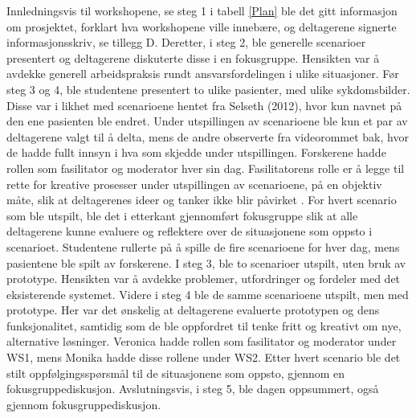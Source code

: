 \noindent
Innledningsvis til workshopene, se steg 1 i tabell \ref{Plan} ble det gitt informasjon om prosjektet, forklart hva workshopene ville innebære, og deltagerene signerte informasjonsskriv, se tillegg D. Deretter, i steg 2, ble generelle scenarioer presentert og deltagerene diskuterte disse i en fokusgruppe. Hensikten var å avdekke generell arbeidspraksis rundt ansvarsfordelingen i ulike situasjoner.
Før steg 3 og 4, ble studentene presentert to ulike pasienter, med ulike sykdomsbilder. Disse var i likhet med scenarioene hentet fra Selseth (2012), hvor kun navnet på den ene pasienten ble endret. Under utspillingen av scenarioene ble kun et par av deltagerene valgt til å delta, mens de andre observerte fra videorommet bak, hvor de hadde fullt innsyn i hva som skjedde under utspillingen. Forskerene hadde rollen som fasilitator og moderator hver sin dag. Fasilitatorens rolle er å legge til rette for kreative prosesser under utspillingen av scenarioene, på en objektiv måte, slik at deltagerenes ideer og tanker ikke blir påvirket \cite{Seland}. For hvert scenario som ble utspilt, ble det i etterkant gjennomført fokusgruppe slik at alle deltagerene kunne evaluere og  reflektere over de situasjonene som oppsto i scenarioet. Studentene rullerte på å spille de fire scenarioene for hver dag, mens pasientene ble spilt av forskerene. I steg 3, ble to scenarioer utspilt, uten bruk av prototype. Hensikten var å avdekke problemer, utfordringer og fordeler med det eksisterende systemet. Videre i steg 4 ble de samme scenarioene utspilt, men med prototype. Her var det ønskelig at deltagerene evaluerte prototypen og dens funksjonalitet, samtidig som de ble oppfordret til tenke fritt og kreativt om nye, alternative løsninger. Veronica hadde rollen som fasilitator og moderator under WS1, mens Monika hadde disse rollene under WS2. Etter hvert scenario ble det stilt oppfølgingsspørsmål til de situasjonene som oppsto, gjennom en fokusgruppediskusjon. Avslutningsvis, i steg 5, ble dagen oppsummert, også gjennom fokusgruppediskusjon. 

